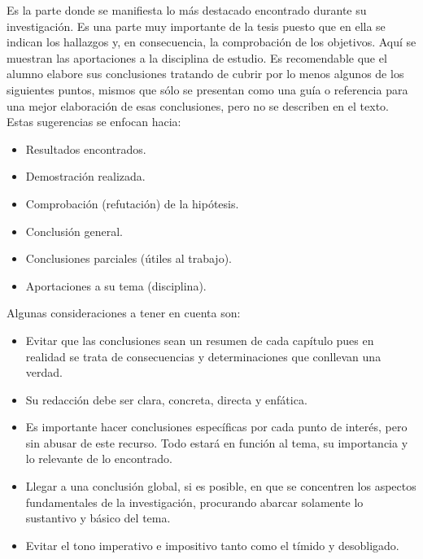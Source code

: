 \documentclass{informe_investigacion}
\begin{document}
\begin{conclusiones}
Es la parte donde se manifiesta lo más destacado encontrado durante su investigación. Es una parte muy importante de la tesis puesto que en ella se indican los hallazgos y, en consecuencia, la comprobación de los objetivos. Aquí se muestran las aportaciones a la disciplina de estudio.
Es recomendable que el alumno elabore sus conclusiones tratando de cubrir por lo menos algunos de los siguientes puntos, mismos que sólo se presentan como una guía o referencia para una mejor elaboración de esas conclusiones, pero no se describen en el texto. Estas sugerencias se enfocan hacia:
\begin{itemize}
    \item Resultados encontrados.
    \item Demostración realizada.
    \item Comprobación (refutación) de la hipótesis.
    \item Conclusión general.
    \item Conclusiones parciales (útiles al trabajo).
    \item Aportaciones a su tema (disciplina).
\end{itemize}

Algunas consideraciones a tener en cuenta son:
\begin{itemize}
    \item Evitar que las conclusiones sean un resumen de cada capítulo pues en realidad se trata de consecuencias y determinaciones que conllevan una verdad.
    \item Su redacción debe ser clara, concreta, directa y enfática.
    \item Es importante hacer conclusiones específicas por cada punto de interés, pero sin abusar de este recurso. Todo estará en función al tema, su importancia y lo relevante de lo encontrado.
    \item Llegar a una conclusión global, si es posible, en que se concentren los aspectos fundamentales de la investigación, procurando abarcar solamente lo sustantivo y básico del tema.
    \item Evitar el tono imperativo e impositivo tanto como el tímido y desobligado.
\end{itemize}

\cite{einstein}

\end{conclusiones}



\end{document}
